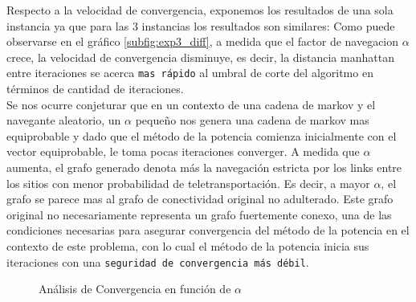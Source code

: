 \begin{LaTeXdescription}
    Respecto a la velocidad de convergencia, exponemos los resultados de una sola instancia ya que para las 3 instancias los resultados son similares: Como puede observarse en el gráfico \ref{subfig:exp3_diff}, a medida que el factor de navegacion $ \alpha $ crece, la velocidad de convergencia disminuye, es decir, la distancia manhattan entre iteraciones se acerca \texttt{mas rápido} al umbral de corte del algoritmo en términos de cantidad de iteraciones.\\

    Se nos ocurre conjeturar que en un contexto de una cadena de markov y el navegante aleatorio, un $\alpha$ pequeño nos genera una cadena de markov mas equiprobable y dado que el método de la potencia comienza inicialmente con el vector equiprobable, le toma pocas iteraciones converger. A medida que $\alpha$ aumenta, el grafo generado denota más la navegación estricta por los links entre los sitios con menor probabilidad de teletransportación. Es decir, a mayor $\alpha$, el grafo se parece mas al grafo de conectividad original no adulterado. Este grafo original no necesariamente representa un grafo fuertemente conexo, una de las condiciones necesarias para asegurar convergencia del método de la potencia en el contexto de este problema, con lo cual el método de la potencia inicia sus iteraciones con una \texttt{seguridad de convergencia más débil}.
\end{LaTeXdescription}

\begin{figure}[H]
    \centering
    \caption{An\'alisis de Convergencia en funci\'on de $\alpha$}
\end{figure}



